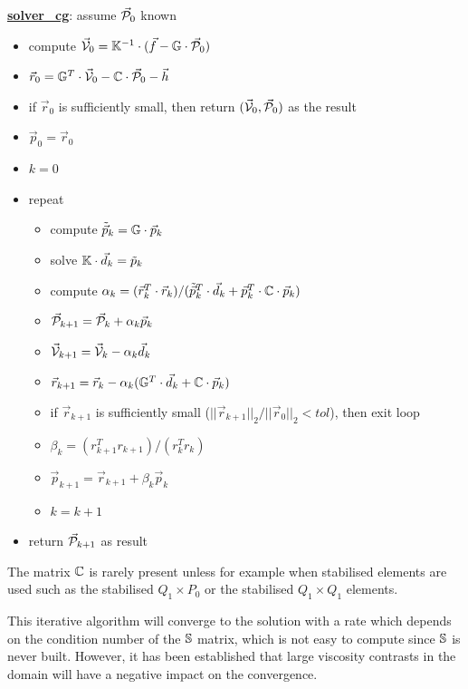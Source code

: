 \begin{mdframed}[backgroundcolor=blue!5]
\underline{\bf solver\_cg}: assume $\vec{\cal P}_0$ known
\begin{itemize}
\item compute $\vec{\cal V}_0={\mathbb{K}}^{-1}\cdot (\vec{f}-{\mathbb{G}} \cdot \vec{\cal P}_0)$
\item $\vec{r}_0 = {\mathbb{G}}^T\cdot \vec{\cal V}_0 -{\mathbb{C}} \cdot \vec{\cal P}_0 - \vec{h}$ 
\item if $\vec{r}_0$ is sufficiently small, then return $(\vec{\cal V}_0,\vec{\cal P}_0)$ as the result
\item $\vec{p}_0=\vec{r}_0$
\item $k=0$
\item repeat
\begin{itemize}
\item compute $\tilde{\vec{p}}_k = {\mathbb{G}} \cdot \vec{p}_k$
\item solve ${\mathbb{K}}\cdot \vec{d}_k = \tilde{p}_k$
\item compute $\alpha_k=(\vec{r}_k^T \cdot  \vec{r}_k)/(\tilde{\vec{p}}_k^T \cdot \vec{d}_k 
      + \vec{p}_k^T \cdot {\mathbb{C}}\cdot \vec{p}_k)$
\item $\vec{\cal P}_{k+1} = \vec{\cal P}_k+\alpha_k \vec{p}_k$
\item $ \vec{\cal V}_{k+1} = \vec{\cal V}_k - \alpha_k \vec{d}_k$
\item $\vec{r}_{k+1} = \vec{r}_k - \alpha_k ({\mathbb{G}}^T \cdot \vec{d}_k + {\mathbb{C}} \cdot \vec{p}_k) $
\item if $\vec{r}_{k+1}$ is sufficiently small ($||\vec{r}_{k+1}||_2/||\vec{r}_0||_2 <tol$), then exit loop
\item $\beta_k=(r_{k+1}^T r_{k+1})/(r_k^T r_k)$
\item $\vec{p}_{k+1} =\vec{r}_{k+1}+ \beta_k \vec{p}_k$
\item $k=k+1$
\end{itemize}
\item return $\vec{\cal P}_{k+1}$ as result
\end{itemize}
\end{mdframed}

\begin{remark}
The matrix ${\mathbb{C}}$ is rarely present unless for example when stabilised elements are used 
such as the stabilised $Q_1\times P_0$ or the stabilised $Q_1\times Q_1$ elements.
\end{remark}

This iterative algorithm will converge to the solution with a rate which depends on 
the condition number of the ${\mathbb{S}}$ matrix, which is not easy to compute since 
${\mathbb{S}}$ is never built. However, it has been established that large viscosity contrasts in the domain 
will have a negative impact on the convergence. 

